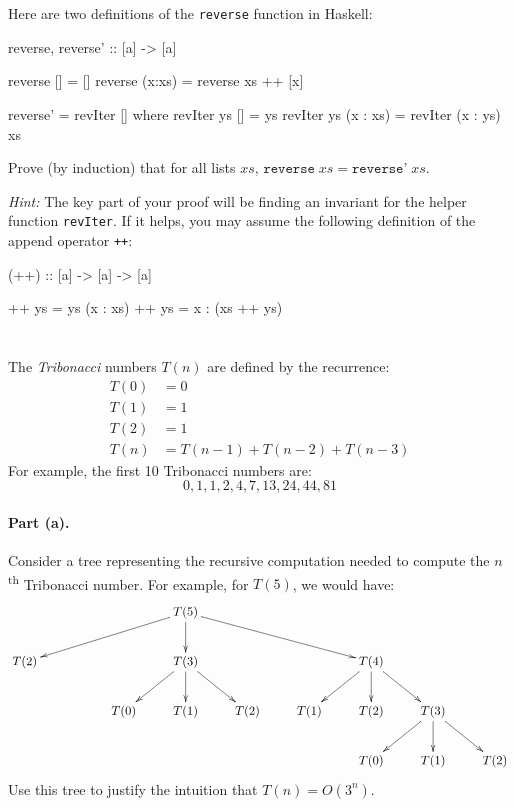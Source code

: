 \documentclass{article}
\newcommand{\Problem}[1][]{\ifthenelse{\equal{#1}{}}{}{\addtocounter{section}{#1}}\clearpage\section{}\setcounter{page}{1}}
\newcommand\CodeSkip{\vspace{-7pt}}
\begin{document}
\Problem

Here are two definitions of the \lstinline!reverse! function in Haskell:
\begin{code}
reverse, reverse' :: [a] -> [a]
\end{code}
\CodeSkip
\begin{code}
reverse []     = []
reverse (x:xs) = reverse xs ++ [x]
\end{code}
\CodeSkip
\begin{code}
reverse' = revIter [] where
  revIter ys [] = ys
  revIter ys (x : xs) = revIter (x : ys) xs
\end{code}
Prove (by induction) that for all lists $xs$, $\texttt{reverse} \; xs = \texttt{reverse'} \; xs$.

\textit{Hint:}  The key part of your proof will be finding an invariant for the helper function \texttt{revIter}.  If it helps, you may assume the following definition of the append operator \texttt{++}:
\begin{code}
(++) :: [a] -> [a] -> [a]
\end{code}
\CodeSkip
\begin{code}
[]       ++ ys = ys
(x : xs) ++ ys = x : (xs ++ ys)
\end{code}

\Problem

The \textit{Tribonacci} numbers $T(n)$ are defined by the recurrence:
\begin{align*}
  T(0) &= 0 \\
  T(1) &= 1 \\
  T(2) &= 1 \\
  T(n) &= T(n - 1) + T(n - 2) + T(n - 3)
\end{align*}
For example, the first 10 Tribonacci numbers are:
\[
  0, 1, 1, 2, 4, 7, 13, 24, 44, 81
\]

\paragraph{Part (a).}

Consider a tree representing the recursive computation needed to compute the $n$\textsuperscript{th} Tribonacci number.  For example, for $T(5)$, we would have:
\[
\xymatrix{
 & & & T(5) \ar[dlll] \ar[d] \ar[drrr] \\
 T(2) & & & T(3) \ar[dl] \ar[d] \ar[dr] & & & T(4) \ar[dl] \ar[d] \ar[dr] \\
 & & T(0) & T(1) & T(2) & T(1) & T(2) & T(3) \ar[dl] \ar[d] \ar[dr] \\
 & & & & & & T(0) & T(1) & T(2)
}
\]
Use this tree to justify the intuition that $T(n) = O(3^n)$.
\end{document}
